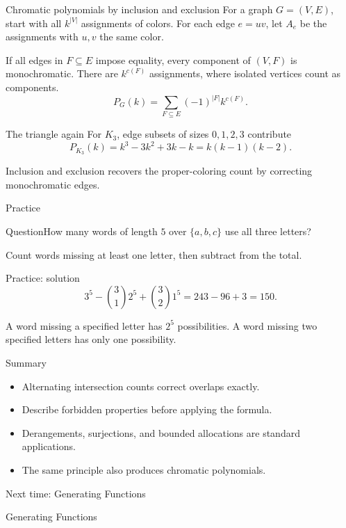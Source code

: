 \documentclass[aspectratio=169,11pt]{beamer}
\newcommand{\Question}[1]{\begin{block}{Question}#1\end{block}}
\newcommand{\gap}{\par\medskip}
\begin{document}
\begin{frame}{Chromatic polynomials by inclusion and exclusion}
\large
\normalsize
For a graph $G=(V,E)$, start with all $k^{|V|}$ assignments of colors. For each edge $e=uv$, let $A_e$ be the assignments with $u,v$ the same color.
\gap If all edges in $F\subseteq E$ impose equality, every component of $(V,F)$ is monochromatic. There are $k^{c(F)}$ assignments, where isolated vertices count as components.
\[P_G(k)=\sum_{F\subseteq E}(-1)^{|F|}k^{c(F)}.\]
\end{frame}
\begin{frame}{The triangle again}
\large
For $K_3$, edge subsets of sizes $0,1,2,3$ contribute
\[P_{K_3}(k)=k^3-3k^2+3k-k
=k(k-1)(k-2).\]
\gap Inclusion and exclusion recovers the proper-coloring count by correcting monochromatic edges.
\end{frame}
\begin{frame}{Practice}
\large
\Question{How many words of length $5$ over $\{a,b,c\}$ use all three letters?}
\gap Count words missing at least one letter, then subtract from the total.
\end{frame}
\begin{frame}{Practice: solution}
\large
\[3^5-\binom312^5+\binom321^5=243-96+3=150.\]
\gap A word missing a specified letter has $2^5$ possibilities. A word missing two specified letters has only one possibility.
\end{frame}
\begin{frame}{Summary}
\large
\begin{itemize}
\item Alternating intersection counts correct overlaps exactly.
\item Describe forbidden properties before applying the formula.
\item Derangements, surjections, and bounded allocations are standard applications.
\item The same principle also produces chromatic polynomials.
\end{itemize}
\end{frame}
\begin{frame}{Next time: Generating Functions}\begin{center}{\Huge Generating Functions}\end{center}\end{frame}
\end{document}
